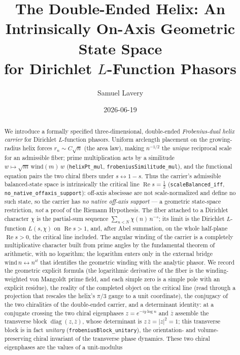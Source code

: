\documentclass[11pt]{article}
\title{The Double-Ended Helix: An Intrinsically On-Axis Geometric State Space\\
for Dirichlet $L$-Function Phasors}
\author{Samuel Lavery}
\date{2026-06-19}
\DeclareMathOperator{\Ree}{Re}
\DeclareMathOperator{\diag}{diag}
\newcommand{\conj}[1]{\overline{#1}}
\newcommand{\code}[1]{\texttt{#1}}
\begin{document}
\maketitle

\begin{abstract}
We introduce a formally specified three-dimensional, double-ended \emph{Frobenius-dual helix carrier}
for Dirichlet $L$-function phasors. Uniform arclength placement on the growing-radius helix forces
$r_n\sim C\sqrt n$ (the area law), making $n^{-1/2}$ the \emph{unique} reciprocal scale for an
admissible fiber; prime multiplication acts by a similitude $w\mapsto\sqrt m\,\mathrm{wind}(m)\,w$
(\code{helixPt\_mul}, \code{frobeniusSimilitude\_mul}), and the functional equation pairs the two
chiral fibers under $s\leftrightarrow1-s$. Thus the carrier's admissible balanced-state space is
intrinsically the critical line $\Ree s=\tfrac12$ (\code{scaleBalanced\_iff},
\code{no\_native\_offaxis\_support}): off-axis abscissae are not scale-normalized and define no such
state, so the carrier has \emph{no native off-axis support} --- a geometric state-space restriction,
\emph{not} a proof of the Riemann Hypothesis. The
fiber attached to a Dirichlet character $\chi$ is the
partial-sum sequence $\sum_{n<N}\chi(n)\,n^{-s}$; its limit is the Dirichlet $L$-function
$L(s,\chi)$ on $\Ree s>1$, and, after Abel summation, on the whole half-plane $\Ree s>0$,
the critical line included. The angular winding of the carrier is a completely multiplicative
character built from prime angles by the fundamental theorem of arithmetic, with no logarithm;
the logarithm enters only in the external bridge $\mathrm{wind}\,n\leftrightarrow n^{it}$ that
identifies the geometric winding with the analytic phasor. We record the geometric explicit
formula (the logarithmic derivative of the fiber is the winding-weighted von Mangoldt prime
field, and each simple zero is a simple pole with an explicit residue), the reality of the
completed object on the critical line (read through a projection that rescales the helix's $\pi/3$
gauge to a unit coordinate), the conjugacy of the two chiralities of the double-ended carrier, and a
determinant identity: at a conjugate crossing the two chiral eigenphases
$z=e^{-iy\log n}$ and $\conj{z}$ assemble the transverse block $\diag(z,\conj z)$, whose
determinant is $z\,\conj z=|z|^2=1$; this transverse block is in fact \emph{unitary}
(\code{frobeniusBlock\_unitary}), the orientation- and volume-preserving chiral invariant of the
transverse phase dynamics. These two chiral eigenphases are the values of a unit-modulus

\end{abstract}
\end{document}
